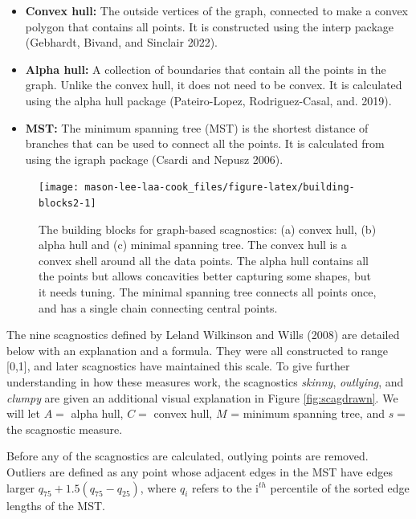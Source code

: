\begin{itemize}
\item
  \textbf{Convex hull:} The outside vertices of the graph, connected to make a convex polygon that contains all points. It is constructed using the interp package (Gebhardt, Bivand, and Sinclair 2022).
\item
  \textbf{Alpha hull:} A collection of boundaries that contain all the points in the graph. Unlike the convex hull, it does not need to be convex. It is calculated using the alpha hull package (Pateiro-Lopez, Rodriguez-Casal, and. 2019).
\item
  \textbf{MST:} The minimum spanning tree (MST) is the shortest distance of branches that can be used to connect all the points. It is calculated from using the igraph package (Csardi and Nepusz 2006).
\end{itemize}

\begin{figure}
\texttt{[image: mason-lee-laa-cook\_files/figure-latex/building-blocks2-1]} \caption{The building blocks for graph-based scagnostics: (a) convex hull, (b) alpha hull and (c) minimal spanning tree. The convex hull is a convex shell around all the data points. The alpha hull contains all the points but allows concavities better capturing some shapes, but it needs tuning. The minimal spanning tree connects all points once, and has a single chain connecting central points.}\label{fig:building-blocks2}
\end{figure}

The nine scagnostics defined by Leland Wilkinson and Wills (2008) are detailed below with an explanation and a formula. They were all constructed to range {[}0,1{]}, and later scagnostics have maintained this scale. To give further understanding in how these measures work, the scagnostics \emph{skinny}, \emph{outlying}, and \emph{clumpy} are given an additional visual explanation in Figure \ref{fig:scagdrawn}. We will let \(A=\) alpha hull, \(C=\) convex hull, \(M\) = minimum spanning tree, and \(s=\) the scagnostic measure.

Before any of the scagnostics are calculated, outlying points are removed. Outliers are defined as any point whose adjacent edges in the MST have edges larger \(q_{75} + 1.5(q_{75} - q_{25})\), where \(q_i\) refers to the i\(^{th}\) percentile of the sorted edge lengths of the MST.

